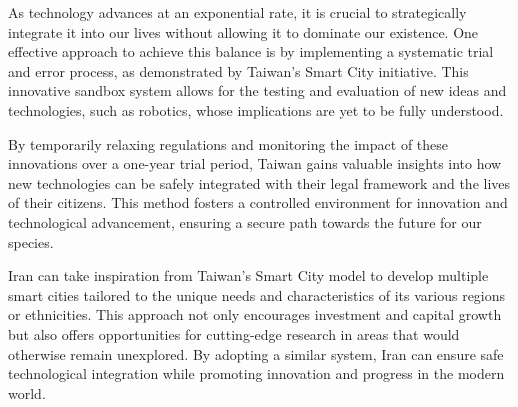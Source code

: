 \documentclass{IEEEtran}
\begin{document}
As technology advances at an exponential rate, it is crucial to strategically integrate it into our lives without allowing it to dominate our existence. One effective approach to achieve this balance is by implementing a systematic trial and error process, as demonstrated by Taiwan's Smart City initiative. This innovative sandbox system allows for the testing and evaluation of new ideas and technologies, such as robotics, whose implications are yet to be fully understood.

By temporarily relaxing regulations and monitoring the impact of these innovations over a one-year trial period, Taiwan gains valuable insights into how new technologies can be safely integrated with their legal framework and the lives of their citizens. This method fosters a controlled environment for innovation and technological advancement, ensuring a secure path towards the future for our species.

Iran can take inspiration from Taiwan's Smart City model to develop multiple smart cities tailored to the unique needs and characteristics of its various regions or ethnicities. This approach not only encourages investment and capital growth but also offers opportunities for cutting-edge research in areas that would otherwise remain unexplored. By adopting a similar system, Iran can ensure safe technological integration while promoting innovation and progress in the modern world.



\end{document}
